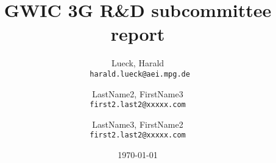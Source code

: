 \documentclass[url,11pt]{article}
\def\biblio{}
\begin{document}
\dosecttoc

\def\biblio{} %
\togglefalse{standalone}


\title{GWIC 3G R\&D subcommittee report }

\author{
  Lueck, Harald\\
  \texttt{
  harald.lueck@aei.mpg.de}
  \and
  LastName2, FirstName3\\
  \texttt{first2.last2@xxxxx.com}
  \and
  LastName3, FirstName2\\
  \texttt{first2.last2@xxxxx.com}
}

\date{\today}
\maketitle
\tableofcontents
\pagebreak



\clearpage


\clearpage


\clearpage


\clearpage


\clearpage

\clearpage

\clearpage

\clearpage

\clearpage


\clearpage

\clearpage

\clearpage

\clearpage



\clearpage
{}
\appendix




\clearpage
{}





%
%
\end{document}
